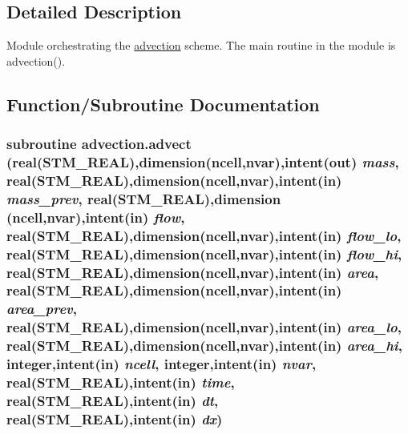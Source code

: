 \subsection{Detailed Description}
Module orchestrating the \hyperlink{a00026}{advection} scheme. The main routine in the module is advection(). 



\subsection{Function/Subroutine Documentation}
\hypertarget{a00026_4dbccca3daf30ad5f7c82915361a78f7}{
\subsubsection[{advect}]{\setlength{\rightskip}{0pt plus 5cm}subroutine advection.advect (real(STM\_\-REAL),dimension(ncell,nvar),intent(out) {\em mass}, \/  real(STM\_\-REAL),dimension(ncell,nvar),intent(in) {\em mass\_\-prev}, \/  real(STM\_\-REAL),dimension   (ncell,nvar),intent(in) {\em flow}, \/  real(STM\_\-REAL),dimension(ncell,nvar),intent(in) {\em flow\_\-lo}, \/  real(STM\_\-REAL),dimension(ncell,nvar),intent(in) {\em flow\_\-hi}, \/  real(STM\_\-REAL),dimension(ncell,nvar),intent(in) {\em area}, \/  real(STM\_\-REAL),dimension(ncell,nvar),intent(in) {\em area\_\-prev}, \/  real(STM\_\-REAL),dimension(ncell,nvar),intent(in) {\em area\_\-lo}, \/  real(STM\_\-REAL),dimension(ncell,nvar),intent(in) {\em area\_\-hi}, \/  integer,intent(in) {\em ncell}, \/  integer,intent(in) {\em nvar}, \/  real(STM\_\-REAL),intent(in) {\em time}, \/  real(STM\_\-REAL),intent(in) {\em dt}, \/  real(STM\_\-REAL),intent(in) {\em dx})}}
\label{a00026_4dbccca3daf30ad5f7c82915361a78f7}


